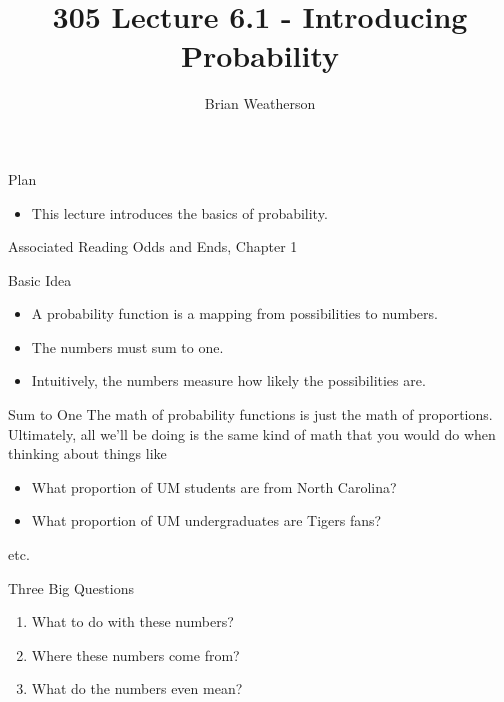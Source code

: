\documentclass[
  ignorenonframetext,
]{beamer}
\title{305 Lecture 6.1 - Introducing Probability}
\author{Brian Weatherson}
\date{}
\providecommand{\tightlist}{%
  \setlength{\itemsep}{0pt}\setlength{\parskip}{0pt}}
\renewcommand{\,}{\text{, }}
\begin{document}
\frame{\titlepage}

\begin{frame}{Plan}
\protect\hypertarget{plan}{}
\begin{itemize}
\tightlist
\item
  This lecture introduces the basics of probability.
\end{itemize}
\end{frame}

\begin{frame}{Associated Reading}
\protect\hypertarget{associated-reading}{}
Odds and Ends, Chapter 1
\end{frame}

\begin{frame}{Basic Idea}
\protect\hypertarget{basic-idea}{}
\begin{itemize}
\tightlist
\item
  A probability function is a mapping from possibilities to numbers.
\item
  The numbers must sum to one.
\item
  Intuitively, the numbers measure how likely the possibilities are.
\end{itemize}
\end{frame}

\begin{frame}{Sum to One}
\protect\hypertarget{sum-to-one}{}
The math of probability functions is just the math of proportions.
Ultimately, all we'll be doing is the same kind of math that you would
do when thinking about things like

\begin{itemize}
\tightlist
\item
  What proportion of UM students are from North Carolina?
\item
  What proportion of UM undergraduates are Tigers fans?
\end{itemize}

etc.
\end{frame}

\begin{frame}{Three Big Questions}
\protect\hypertarget{three-big-questions}{}
\begin{enumerate}[<+->]
\tightlist
\item
  What to do with these numbers?
\item
  Where these numbers come from?
\item
  What do the numbers even mean?
\end{enumerate}
\end{frame}
\end{document}
